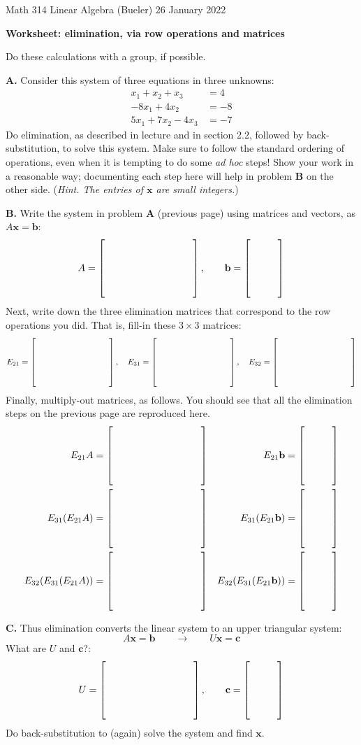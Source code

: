 \documentclass[11pt]{amsart}
\newcommand{\bb}{\mathbf{b}}
\newcommand{\bc}{\mathbf{c}}
\newcommand{\bx}{\mathbf{x}}
\newcommand{\prob}[1]{\bigskip\noindent\textbf{#1.}\quad }
\begin{document}
\scriptsize \noindent Math 314 Linear Algebra (Bueler) \hfill 26 January 2022 
\normalsize\medskip

\Large\centerline{\textbf{Worksheet: elimination, via row operations and matrices}}
\medskip
\normalsize

\thispagestyle{empty}
\begin{center}
Do these calculations with a group, if possible.
\end{center}

\prob{A}  Consider this system of three equations in three unknowns:
\begin{align*}
         x_1 + x_2 + x_3 &= 4 \\
      -8 x_1 + 4 x_2 \qquad &= -8 \\
       5 x_1 + 7 x_2 - 4 x_3 &= -7
\end{align*}
Do elimination, as described in lecture and in section 2.2, followed by back-substitution, to solve this system.  Make sure to follow the standard ordering of operations, even when it is tempting to do some \emph{ad hoc} steps!  Show your work in a reasonable way; documenting each step here will help in problem \textbf{B} on the other side.  (\emph{Hint.  The entries of $\bx$ are small integers.})
\vfill

\clearpage \newpage
\newcommand{\blankA}{\left[\begin{matrix} {\Huge \strut} \\ {\Huge \strut} \end{matrix} \phantom{lkdjfs adfk dsas dsff} \right]}
\newcommand{\blankb}{\left[\begin{matrix} {\Huge \strut} \\ {\Huge \strut} \end{matrix} \phantom{lkdf ed} \right]}

\prob{B}  Write the system in problem \textbf{A} (previous page) using matrices and vectors, as $A \bx = \bb$:
   $$A = \blankA, \qquad \bb = \blankb$$
Next, write down the three elimination matrices that correspond to the row operations you did.  That is, fill-in these $3\times 3$ matrices:
   $$E_{21} = \blankA, \quad E_{31} = \blankA, \quad E_{32} = \blankA$$
Finally, multiply-out matrices, as follows.  You should see that all the elimination steps on the previous page are reproduced here.
\begin{align*}
E_{21} A &= \blankA                   & E_{21} \bb &= \blankb \\
E_{31} (E_{21} A) &= \blankA          & E_{31} (E_{21} \bb) &= \blankb \\
E_{32} (E_{31} (E_{21} A)) &= \blankA & E_{32} (E_{31} (E_{21} \bb)) &= \blankb
\end{align*}
\vspace{1.0in}

\prob{C} Thus elimination converts the linear system to an upper triangular system:
    $$A\bx = \bb \qquad \longrightarrow \qquad U \bx = \bc$$
What are $U$ and $\bc$?:
   $$U = \blankA, \qquad \bc = \blankb$$
Do back-substitution to (again) solve the system and find $\bx$.
\vfill
\end{document}
